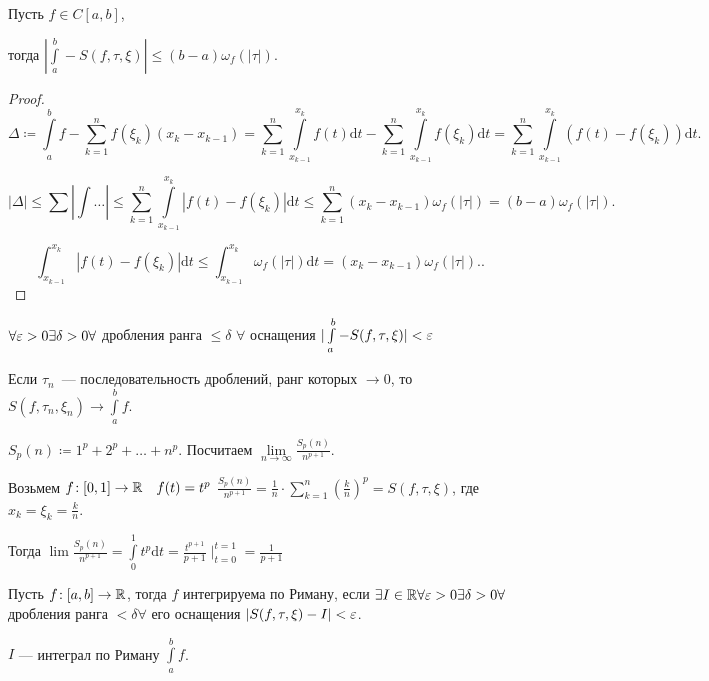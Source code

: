 \begin{theorem}
    Пусть $f \in C[a, b]$,

    тогда  $|\int\limits_a^b - S(f, \tau, \xi)| \le (b-a)\omega_f(|\tau|)$.
\end{theorem}
\begin{proof}
    \[\Delta \coloneqq \int\limits_a^b f - \sum\limits_{k=1}^n f(\xi_k)(x_k - x_{k-1}) = \sum\limits_{k=1}^n \int\limits_{x_{k-1}}^{x_k} f(t)\mathrm{d}t - \sum\limits_{k=1}^n \int\limits_{x_{k-1}}^{x_k}f(\xi_k) \mathrm{d}t = \sum\limits_{k=1}^n \int\limits_{x_{k-1}}^{x_k}(f(t) - f(\xi_k))\mathrm{d}t.\] 

    \[|\Delta| \le \sum |\int \ldots| \le \sum\limits_{k=1}^n \int\limits_{x_{k-1}}^{x_k} |f(t) - f(\xi_k)| \mathrm{d}t \le \sum_{k=1}^n (x_k - x_{k-1})\omega_f(|\tau|) = (b-a)\omega_f(|\tau|).\]

    \[
        \int_{x_{k-1}}^{x_k} |f(t) - f(\xi_k)| \mathrm{d}t \le \int_{x_{k-1}}^{x_k} \omega_f(|\tau|) \mathrm{d}t = (x_k - x_{k-1}) \omega_f(|\tau|).
    .\] 
\end{proof}
\begin{consequence}
    $\forall \varepsilon > 0 \exists \delta > 0 \forall$ дробления ранга  $\le \delta$ $\forall$ оснащения  $|\int\limits_a^b - S(f, \tau, \xi)| < \varepsilon$
\end{consequence}
\begin{consequence}
    Если $\tau_n$~--- последовательность дроблений, ранг которых  $\to 0$, то $S(f, \tau_n, \xi_n) \to \int\limits_a^b f$.  
\end{consequence}
\begin{example}
    $S_p(n) \coloneqq 1^p + 2^p + \ldots + n^p$. Посчитаем $\lim\limits_{n \to \infty} \frac{S_p(n)}{n^{p+1}}$.

    Возьмем $f\!: [0,1] \to \mathbb{R}\quad f(t) = t^p$
    $\frac{S_p(n)}{n^{p+1}} = \frac{1}{n} \cdot \sum\limits_{k=1}^n \left(\frac{k}{n}\right)^p = S(f, \tau, \xi)$, где $x_k = \xi_k = \frac{k}{n}$.

    Тогда $\lim \frac{S_p(n)}{n^{p+1}} = \int\limits_0^1 t^p \mathrm{d}t = \frac{t^{p+1}}{p+1} \mid_{t=0}^{t=1} = \frac{1}{p+1}$
\end{example}

\begin{definition}
    Пусть $f\!: [a, b] \to \mathbb{R}$, тогда $f$  интегрируема по Риману, если $\exists I \in \mathbb{R} \forall \varepsilon > 0 \exists \delta > 0 \forall$ дробления ранга  $< \delta \forall$ его оснащения  $|S(f, \tau, \xi) - I| < \varepsilon$. 

     $I$ --- интеграл по Риману  $\int\limits_a^b f$.
\end{definition}

